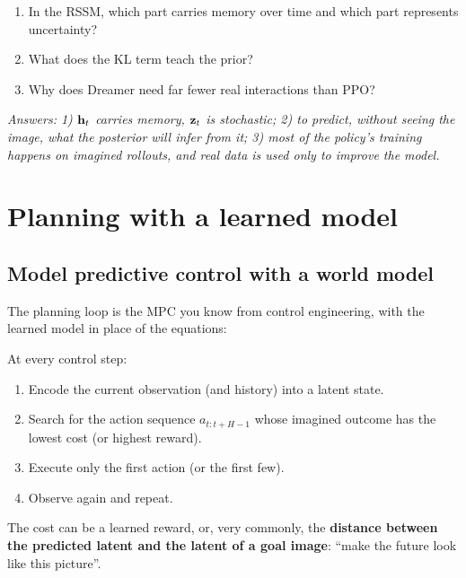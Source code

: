 \begin{quizbox}
\begin{enumerate}[leftmargin=*]
\item In the RSSM, which part carries memory over time and which part represents uncertainty?
\item What does the KL term teach the prior?
\item Why does Dreamer need far fewer real interactions than PPO?
\end{enumerate}
\emph{Answers: 1) $\mathbf{h}_t$ carries memory, $\mathbf{z}_t$ is stochastic; 2) to predict, without seeing the image, what the posterior will infer from it; 3) most of the policy's training happens on imagined rollouts, and real data is used only to improve the model.}
\end{quizbox}

\section{Planning with a learned model}
\label{sec:latentplan}

\subsection{Model predictive control with a world model}
The planning loop is the MPC you know from control engineering, with the learned model in place of the equations:
\begin{algbox}
At every control step:
\begin{enumerate}[leftmargin=*]
\item Encode the current observation (and history) into a latent state.
\item Search for the action sequence $a_{t:t+H-1}$ whose imagined outcome has the lowest cost (or highest reward).
\item Execute only the first action (or the first few).
\item Observe again and repeat.
\end{enumerate}
\end{algbox}
The cost can be a learned reward, or, very commonly, the \textbf{distance between the predicted latent and the latent of a goal image}: ``make the future look like this picture''.

